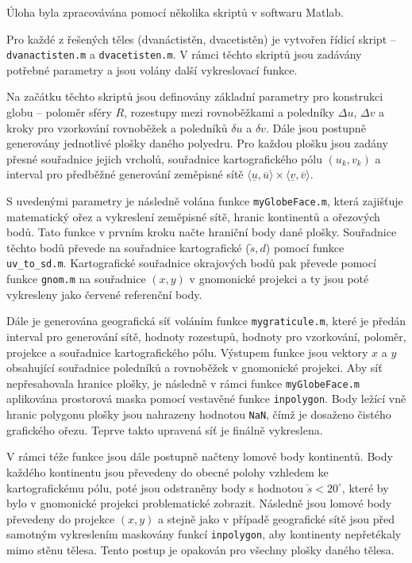 \documentclass[12pt]{article}
\begin{document}
Úloha byla zpracovávána pomocí několika skriptů v softwaru Matlab. 

Pro každé z řešených těles (dvanáctistěn, dvacetistěn) je vytvořen řídicí skript – \texttt{dvanactisten.m} a \texttt{dvacetisten.m}. V rámci těchto skriptů jsou zadávány potřebné parametry a jsou volány další vykreslovací funkce.

Na začátku těchto skriptů jsou definovány základní parametry pro konstrukci globu – poloměr sféry $R$, rozestupy mezi rovnoběžkami a poledníky $\Delta u$, $\Delta v$ a kroky pro vzorkování rovnoběžek a poledníků $\delta u$ a $\delta v$. Dále jsou postupně generovány jednotlivé plošky daného polyedru. Pro každou plošku jsou zadány přesné souřadnice jejich vrcholů, souřadnice kartografického pólu $(u_k, v_k)$ a interval pro předběžné generování zeměpisné sítě $\langle \underline{u}, \overline{u} \rangle \times \langle \underline{v}, \overline{v} \rangle$.

S uvedenými parametry je následně volána funkce \texttt{myGlobeFace.m}, která zajišťuje matematický ořez a vykreslení zeměpisné sítě, hranic kontinentů a ořezových bodů. Tato funkce v prvním kroku načte hraniční body dané plošky. Souřadnice těchto bodů převede na souřadnice kartografické ($\check{s}, d$) pomocí funkce \texttt{uv\_to\_sd.m}. Kartografické souřadnice okrajových bodů pak převede pomocí funkce \texttt{gnom.m} na souřadnice $(x,y)$ v gnomonické projekci a ty jsou poté vykresleny jako červené referenční body. 

Dále je generována geografická síť voláním funkce \texttt{mygraticule.m}, které je předán interval pro generování sítě, hodnoty rozestupů, hodnoty pro vzorkování, poloměr, projekce a souřadnice kartografického pólu. Výstupem funkce jsou vektory $x$ a $y$ obsahující souřadnice poledníků a rovnoběžek v gnomonické projekci. Aby síť nepřesahovala hranice plošky, je následně v rámci funkce \texttt{myGlobeFace.m} aplikována prostorová maska pomocí vestavěné funkce \texttt{inpolygon}. Body ležící vně hranic polygonu plošky jsou nahrazeny hodnotou \texttt{NaN}, čímž je dosaženo čistého grafického ořezu. Teprve takto upravená síť je finálně vykreslena.

V rámci téže funkce jsou dále postupně načteny lomové body kontinentů. Body každého kontinentu jsou převedeny do obecné polohy vzhledem ke kartografickému pólu, poté jsou odstraněny body s hodnotou $\check{s} < 20^\circ$, které by bylo v gnomonické projekci problematické zobrazit. Následně jsou lomové body převedeny do projekce $(x,y)$ a stejně jako v případě geografické sítě jsou před samotným vykreslením maskovány funkcí \texttt{inpolygon}, aby kontinenty nepřetékaly mimo stěnu tělesa. Tento postup je opakován pro všechny plošky daného tělesa.
\end{document}
